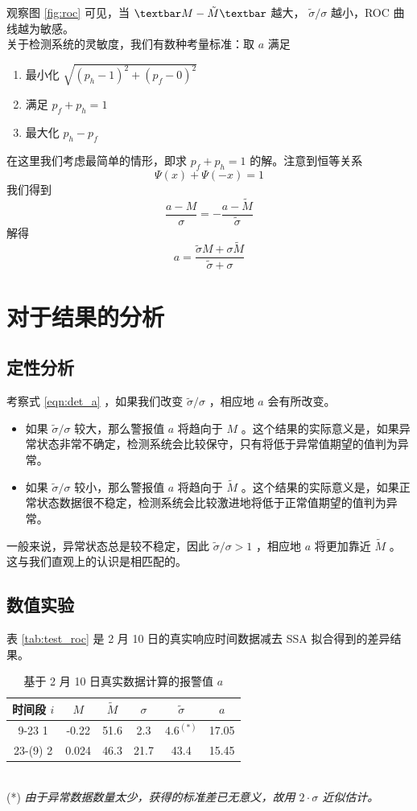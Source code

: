 \documentclass[a4paper]{article}
\begin{document}
观察图 \ref{fig:roc} 可见，当 $\textbar M - \tilde{M} \textbar $ 越大， $ \tilde{\sigma} / \sigma $ 越小，ROC 曲线越为敏感。
\\
关于检测系统的灵敏度，我们有数种考量标准：取 $a$ 满足
\begin{enumerate}
	\item 最小化 $\sqrt{(p_h - 1)^2 + (p_f - 0)^2}$
	\item 满足 $p_f + p_h = 1$
	\item 最大化 $p_h - p_f$
\end{enumerate}
在这里我们考虑最简单的情形，即求 $p_f + p_h = 1$ 的解。注意到恒等关系 $$\Psi(x) + \Psi(-x) = 1$$ 我们得到
\begin{equation}
	\label{eqn:det_a_formula}
	\frac{a-M}{\sigma} = -\frac{a-\tilde{M}}{\tilde{\sigma}}
\end{equation}
解得
\begin{equation}
	\label{eqn:det_a}
	a = \frac{\tilde{\sigma}M + \sigma \tilde{M}}{\tilde{\sigma} + \sigma}
\end{equation}

\section{对于结果的分析}
\subsection{定性分析}
考察式 \ref{eqn:det_a} ，如果我们改变 $\tilde{\sigma}/\sigma$ ，相应地 $a$ 会有所改变。
\begin{itemize}
\item 如果 $\tilde{\sigma}/\sigma$ 较大，那么警报值 $a$ 将趋向于 $M$ 。这个结果的实际意义是，如果异常状态非常不确定，检测系统会比较保守，只有将低于异常值期望的值判为异常。
\item 如果 $\tilde{\sigma}/\sigma$ 较小，那么警报值 $a$ 将趋向于 $\tilde{M}$ 。这个结果的实际意义是，如果正常状态数据很不稳定，检测系统会比较激进地将低于正常值期望的值判为异常。
\end{itemize}
一般来说，异常状态总是较不稳定，因此 $\tilde{\sigma}/\sigma > 1$ ，相应地 $a$ 将更加靠近 $\tilde{M}$ 。
这与我们直观上的认识是相匹配的。
\subsection{数值实验}
表 \ref{tab:test_roc} 是 2 月 10 日的真实响应时间数据减去 SSA 拟合得到的差异结果。
\begin{table}[htbp]
	\centering
	\caption{基于 2 月 10 日真实数据计算的报警值 $a$}
	\label{tab:test_roc}
\label{my-label}
\begin{tabular}{c|cccc|c}
\hline
时间段 $i$  & $M$   & $\tilde{M}$ & $\sigma$ & $\tilde{\sigma}$ & $a$    \\
\hline
9-23 1   & -0.22 & 51.6        & 2.3     & $4.6^{(*)} $     & 17.05 \\
23-(9) 2 & 0.024 & 46.3        & 21.7    & 43.4             & 15.45 \\
\hline
\end{tabular}
\end{table}\\
(*) \emph{由于异常数据数量太少，获得的标准差已无意义，故用 $2 \cdot \sigma$ 近似估计。}
\end{document}
